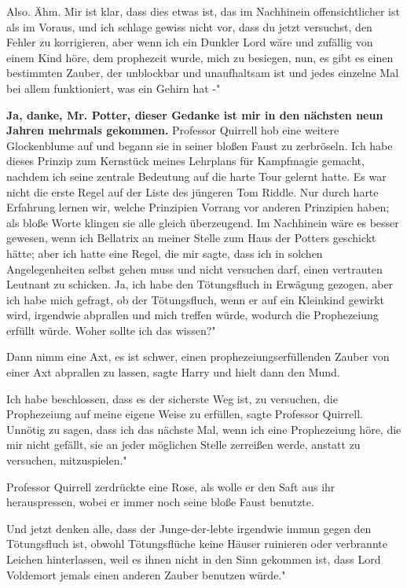 \glqq{}Also. Ähm. Mir ist klar, dass dies etwas ist, das im Nachhinein
offensichtlicher ist als im Voraus, und ich schlage gewiss nicht vor, dass du
jetzt versuchst, den Fehler zu korrigieren, aber wenn ich ein Dunkler Lord wäre
und zufällig von einem Kind höre, dem prophezeit wurde, mich zu besiegen, nun,
es gibt es einen bestimmten Zauber, der unblockbar und unaufhaltsam ist und
jedes einzelne Mal bei allem funktioniert, was ein Gehirn hat -"

\glqq{}\textbf{Ja, danke, Mr. Potter, dieser Gedanke ist mir in den nächsten neun
Jahren mehrmals gekommen.}\grqq{} Professor Quirrell hob eine weitere
Glockenblume auf und begann sie in seiner bloßen Faust zu zerbröseln. \glqq{}Ich
habe dieses Prinzip zum Kernstück meines Lehrplans für Kampfmagie gemacht,
nachdem ich seine zentrale Bedeutung auf die harte Tour gelernt hatte. Es war
nicht die erste Regel auf der Liste des jüngeren Tom Riddle. Nur durch harte
Erfahrung lernen wir, welche Prinzipien Vorrang vor anderen Prinzipien haben;
als bloße Worte klingen sie alle gleich überzeugend. Im Nachhinein wäre es
besser gewesen, wenn ich Bellatrix an meiner Stelle zum Haus der Potters
geschickt hätte; aber ich hatte eine Regel, die mir sagte, dass ich in solchen
Angelegenheiten selbst gehen muss und nicht versuchen darf, einen vertrauten
Leutnant zu schicken. Ja, ich habe den Tötungsfluch in Erwägung gezogen, aber
ich habe mich gefragt, ob der Tötungsfluch, wenn er auf ein Kleinkind gewirkt
wird, irgendwie abprallen und mich treffen würde, wodurch die Prophezeiung
erfüllt würde. Woher sollte ich das wissen?"

\glqq{}Dann nimm eine Axt, es ist schwer, einen prophezeiungserfüllenden Zauber
von einer Axt abprallen zu lassen\grqq{}, sagte Harry und hielt dann den Mund.

\glqq{}Ich habe beschlossen, dass es der sicherste Weg ist, zu versuchen, die
Prophezeiung auf meine eigene Weise zu erfüllen\grqq{}, sagte Professor
Quirrell. \glqq{}Unnötig zu sagen, dass ich das nächste Mal, wenn ich eine
Prophezeiung höre, die mir nicht gefällt, sie an jeder möglichen Stelle
zerreißen werde, anstatt zu versuchen, mitzuspielen."

Professor Quirrell zerdrückte eine Rose, als wolle er den Saft aus ihr
herauspressen, wobei er immer noch seine bloße Faust benutzte.

\glqq{}Und jetzt denken alle, dass der Junge-der-lebte irgendwie immun gegen den
Tötungsfluch ist, obwohl Tötungsflüche keine Häuser ruinieren oder verbrannte
Leichen hinterlassen, weil es ihnen nicht in den Sinn gekommen ist, dass Lord
Voldemort jemals einen anderen Zauber benutzen würde."

